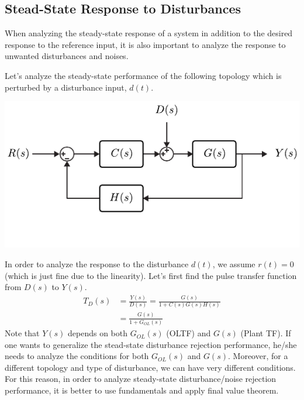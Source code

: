 \documentclass[twoside]{article}
\begin{document}
\newpage

\subsection{Stead-State Response to Disturbances}

When analyzing the steady-state response of a system in addition to
the desired response to the reference input, it is also important
to analyze the response to unwanted disturbances and noises. 

Let's analyze the steady-state performance of the following 
topology which is perturbed by a disturbance input, $d(t)$. 

\begin{center}
\begin{minipage}[h]{0.75\linewidth}
    \begin{center}
      \includegraphics[width=\textwidth]{disturb}
    \end{center}
\end{minipage}
\end{center}

In order to analyze the response to the disturbance $d(t)$, we assume 
$r(t) = 0$ (which is just fine due to the linearity). Let's first find
the pulse transfer function from $D(s)$ to $Y(s)$. 
%
\begin{align*}
T_D(s) &= \frac{Y(s)}{D(s)} =  \frac{G(s)}{1 + C(s) G(s) H(s)}
\\
&= \frac{G(s)}{1 + G_{OL}(s)}
\end{align*}
%
Note that $Y(s)$ depends on both $G_{OL}(s)$ (OLTF) and $G(s)$ (Plant TF). 
If one wants to generalize the stead-state disturbance rejection performance,
he/she needs to analyze the conditions for both $G_{OL}(s)$ and $G(s)$. Moreover,
for a different topology and type of disturbance, we can have very different conditions. 
For this reason, in order to analyze steady-state disturbance/noise rejection
performance, it is better to use fundamentals and apply final value theorem.
\end{document}
